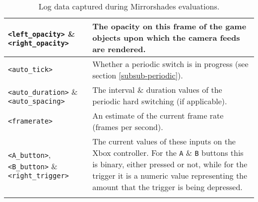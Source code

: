 \begin{center}
\begin{longtable}{| l | p{8cm} |}
\hline

\texttt{<left\_opacity>} \& \texttt{<right\_opacity>} & The opacity on this frame of the game objects upon which the camera feeds are rendered. \\

\hline

\texttt{<auto\_tick>} & Whether a periodic switch is in progress (see section \ref{subsub-periodic}). \\

\hline

\texttt{<auto\_duration>} \& \texttt{<auto\_spacing>} & The interval \& duration values of the periodic hard switching (if applicable). \\

\hline

\texttt{<framerate>} & An estimate of the current frame rate (frames per second). \\

\hline

\texttt{<A\_button>}, \texttt{<B\_button>} \& \texttt{<right\_trigger>} & The current values of these inputs on the Xbox controller. For the \texttt{A} \& \texttt{B} buttons this is binary, either pressed or not, while for the trigger it is a numeric value representing the amount that the trigger is being depressed. \\

\hline
\caption{Log data captured during Mirrorshades evaluations.}
\label{logdatatable}
\end{longtable}
\end{center}




	
	
